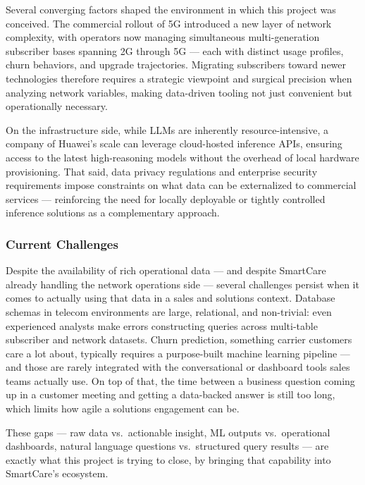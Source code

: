 Several converging factors shaped the environment in which this project was conceived. 
The commercial rollout of 5G introduced a new layer of network complexity, with 
operators now managing simultaneous multi-generation subscriber bases spanning 2G 
through 5G --- each with distinct usage profiles, churn behaviors, and upgrade 
trajectories. Migrating subscribers toward newer technologies therefore requires a 
strategic viewpoint and surgical precision when analyzing network variables, making 
data-driven tooling not just convenient but operationally necessary.

On the infrastructure side, while LLMs are inherently resource-intensive, a company 
of Huawei's scale can leverage cloud-hosted inference APIs, ensuring access to the 
latest high-reasoning models without the overhead of local hardware provisioning. 
That said, data privacy regulations and enterprise security requirements impose 
constraints on what data can be externalized to commercial services --- reinforcing 
the need for locally deployable or tightly controlled inference solutions as a 
complementary approach.

\subsubsection{Current Challenges}\label{sec:challenges}

Despite the availability of rich operational data --- and despite SmartCare already 
handling the network operations side --- several challenges persist when it comes to 
actually using that data in a sales and solutions context. Database schemas in 
telecom environments are large, relational, and non-trivial: even experienced 
analysts make errors constructing queries across multi-table subscriber and network 
datasets. Churn prediction, something carrier customers care a lot about, typically 
requires a purpose-built machine learning pipeline --- and those are rarely integrated 
with the conversational or dashboard tools sales teams actually use. On top of that, 
the time between a business question coming up in a customer meeting and getting a 
data-backed answer is still too long, which limits how agile a solutions engagement 
can be.

These gaps --- raw data vs.\ actionable insight, ML outputs vs.\ operational 
dashboards, natural language questions vs.\ structured query results --- are exactly 
what this project is trying to close, by bringing that capability into SmartCare's 
ecosystem.

